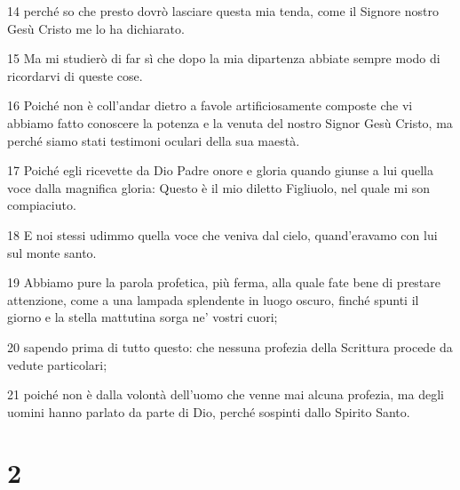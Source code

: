 \par 14 perché so che presto dovrò lasciare questa mia tenda, come il Signore nostro Gesù Cristo me lo ha dichiarato.
\par 15 Ma mi studierò di far sì che dopo la mia dipartenza abbiate sempre modo di ricordarvi di queste cose.
\par 16 Poiché non è coll'andar dietro a favole artificiosamente composte che vi abbiamo fatto conoscere la potenza e la venuta del nostro Signor Gesù Cristo, ma perché siamo stati testimoni oculari della sua maestà.
\par 17 Poiché egli ricevette da Dio Padre onore e gloria quando giunse a lui quella voce dalla magnifica gloria: Questo è il mio diletto Figliuolo, nel quale mi son compiaciuto.
\par 18 E noi stessi udimmo quella voce che veniva dal cielo, quand'eravamo con lui sul monte santo.
\par 19 Abbiamo pure la parola profetica, più ferma, alla quale fate bene di prestare attenzione, come a una lampada splendente in luogo oscuro, finché spunti il giorno e la stella mattutina sorga ne' vostri cuori;
\par 20 sapendo prima di tutto questo: che nessuna profezia della Scrittura procede da vedute particolari;
\par 21 poiché non è dalla volontà dell'uomo che venne mai alcuna profezia, ma degli uomini hanno parlato da parte di Dio, perché sospinti dallo Spirito Santo.

\chapter{2}

